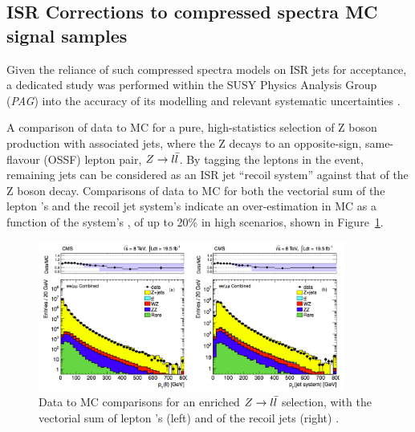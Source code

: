 

\subsection{ISR Corrections to compressed spectra MC signal samples}
\label{sec:isr_reweighting}

Given the reliance of such compressed spectra models on ISR jets for acceptance,
a dedicated study was performed within the SUSY Physics Analysis Group (\emph{PAG})
into the accuracy of its modelling and relevant systematic uncertainties \cite{susy-isrrw}.

A comparison of data to MC for a pure, high-statistics selection
of Z boson production with associated jets, where the Z decays to an opposite-sign,
same-flavour (OSSF) lepton pair, $Z\rightarrow l\bar{l}$. By tagging the leptons in 
the event, remaining jets can be considered as an ISR jet ``recoil system'' 
against that of the Z boson decay. Comparisons of data to MC for both the 
vectorial sum of the lepton \Ptvect's and the recoil jet system's \Ptvect indicate an
over-estimation in MC as a function of the system's \Pt, of up to 20\% in 
high \Pt scenarios, shown in Figure~\ref{fig:isr_datamc}.

\begin{figure}[t!]
    \centering
    \includegraphics[width=0.9\textwidth]{Figs/isr/isr_zjets_distros.pdf}
    \caption{Data to MC comparisons for an enriched $Z \rightarrow l\bar{l}$ selection, 
    with the vectorial sum of lepton \Pt's (left) and of the recoil jets (right)
    \cite{susy-isrrw}.}
    \label{fig:isr_datamc}
\end{figure}

